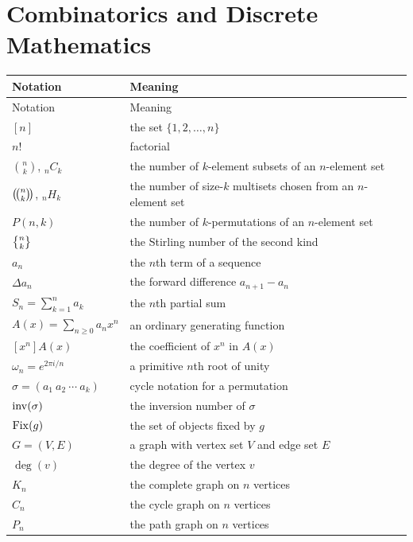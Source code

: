     \section*{Combinatorics and Discrete Mathematics}

    {\small
    \renewcommand{\arraystretch}{1.18}
    \begin{longtable}{@{}L{0.27\textwidth}L{0.65\textwidth}@{}}
        \toprule
        Notation & Meaning \\
        \midrule
        \endfirsthead

        \toprule
        Notation & Meaning \\
        \midrule
        \endhead

        \bottomrule
        \endlastfoot

        $[n]$ & the set $\{1,2,\dots,n\}$ \\
        $n!$ & factorial \\
        $\binom{n}{k}$, ${}_nC_k$ & the number of $k$-element subsets of an $n$-element set \\
        $\left(\!\binom{n}{k}\!\right)$, ${}_nH_k$ & the number of size-$k$ multisets chosen from an $n$-element set \\
        $P(n,k)$ & the number of $k$-permutations of an $n$-element set \\
        $\stirlingsecond{n}{k}$ & the Stirling number of the second kind \\
        $a_n$ & the $n$th term of a sequence \\
        $\Delta a_n$ & the forward difference $a_{n+1}-a_n$ \\
        $S_n=\displaystyle\sum_{k=1}^{n}a_k$ & the $n$th partial sum \\
        $A(x)=\displaystyle\sum_{n\geq0}a_nx^n$ & an ordinary generating function \\
        $[x^n]A(x)$ & the coefficient of $x^n$ in $A(x)$ \\
        $\omega_n=e^{2\pi i/n}$ & a primitive $n$th root of unity \\
        $\sigma=(a_1\ a_2\ \cdots\ a_k)$ & cycle notation for a permutation \\
        $\operatorname{inv}(\sigma)$ & the inversion number of $\sigma$ \\
        $\operatorname{Fix}(g)$ & the set of objects fixed by $g$ \\
        $G=(V,E)$ & a graph with vertex set $V$ and edge set $E$ \\
        $\deg(v)$ & the degree of the vertex $v$ \\
        $K_n$ & the complete graph on $n$ vertices \\
        $C_n$ & the cycle graph on $n$ vertices \\
        $P_n$ & the path graph on $n$ vertices \\
    \end{longtable}
    }


